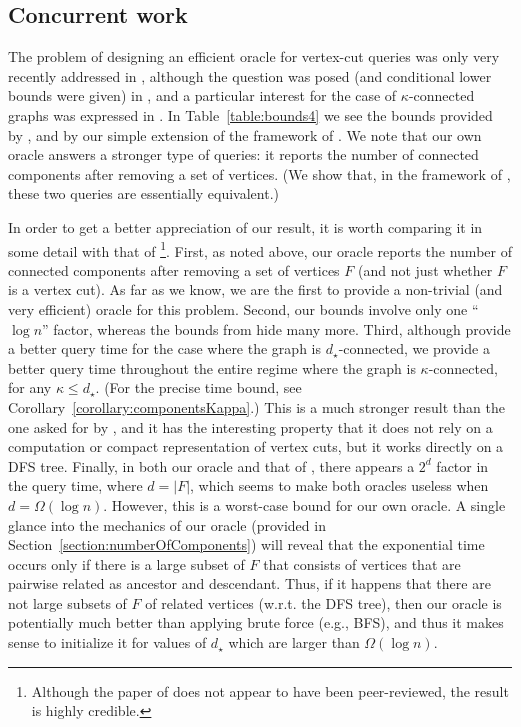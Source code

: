 \documentclass[11pt,a4paper]{article}
\begin{document}
\subsection{Concurrent work} 
The problem of designing an efficient oracle for vertex-cut queries was only very recently addressed in \cite{arxivMerav}, although the question was posed (and conditional lower bounds were given) in \cite{DBLP:conf/focs/LongS22}, and a particular interest for the case of $\kappa$-connected graphs was expressed in \cite{DBLP:conf/icalp/PettieY21}. In Table~\ref{table:bounds4} we see the bounds provided by \cite{arxivMerav}, and by our simple extension of the framework of \cite{DBLP:conf/esa/Kosinas23}. We note that our own oracle answers a stronger type of queries: it reports the number of connected components after removing a set of vertices. (We show that, in the framework of \cite{DBLP:conf/esa/Kosinas23}, these two queries are essentially equivalent.)

In order to get a better appreciation of our result, it is worth comparing it in some detail with that of \cite{arxivMerav}\footnote{Although the paper of \cite{arxivMerav} does not appear to have been peer-reviewed, the result is highly credible.}. First, as noted above, our oracle reports the number of connected components after removing a set of vertices $F$ (and not just whether $F$ is a vertex cut). As far as we know, we are the first to provide a non-trivial (and very efficient) oracle for this problem. Second, our bounds involve only one ``$\log{n}$'' factor, whereas the bounds from \cite{arxivMerav} hide many more. Third, although \cite{arxivMerav} provide a better query time for the case where the graph is $d_{\star}$-connected, we provide a better query time throughout the entire regime where the graph is $\kappa$-connected, for any $\kappa\leq d_{\star}$. (For the precise time bound, see Corollary~\ref{corollary:componentsKappa}.) This is a much stronger result than the one asked for by \cite{DBLP:conf/icalp/PettieY21}, and it has the interesting property that it does not rely on a computation or compact representation of vertex cuts, but it works directly on a DFS tree. Finally, in both our oracle and that of \cite{arxivMerav}, there appears a $2^d$ factor in the query time, where $d=|F|$, which seems to make both oracles useless when $d=\Omega(\log{n})$. However, this is a worst-case bound for our own oracle. A single glance into the mechanics of our oracle (provided in Section~\ref{section:numberOfComponents}) will reveal that the exponential time occurs only if there is a large subset of $F$ that consists of vertices that are pairwise related as ancestor and descendant. Thus, if it happens that there are not large subsets of $F$ of related vertices (w.r.t. the DFS tree), then our oracle is potentially much better than applying brute force (e.g., BFS), and thus it makes sense to initialize it for values of $d_{\star}$ which are larger than $\Omega(\log{n})$.
\end{document}
